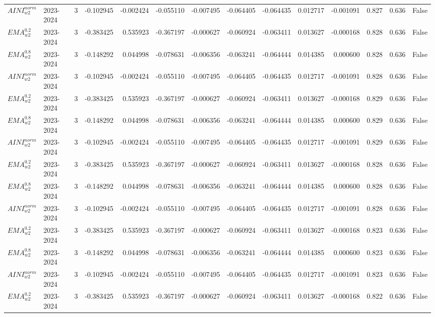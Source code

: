 \begin{tabular}{@{}llrrrrrrrrrlll@{}}
$AINI^{norm}_{w2}$ & 2023-2024 & 3 & -0.102945 & -0.002424 & -0.055110 & -0.007495 & -0.064405 & -0.064435 & 0.012717 & -0.001091 & 0.827 & 0.636 & False \\
$EMA^{0.2}_{w2}$ & 2023-2024 & 3 & -0.383425 & 0.535923 & -0.367197 & -0.000627 & -0.060924 & -0.063411 & 0.013627 & -0.000168 & 0.828 & 0.636 & False \\
$EMA^{0.8}_{w2}$ & 2023-2024 & 3 & -0.148292 & 0.044998 & -0.078631 & -0.006356 & -0.063241 & -0.064444 & 0.014385 & 0.000600 & 0.828 & 0.636 & False \\
$AINI^{norm}_{w2}$ & 2023-2024 & 3 & -0.102945 & -0.002424 & -0.055110 & -0.007495 & -0.064405 & -0.064435 & 0.012717 & -0.001091 & 0.828 & 0.636 & False \\
$EMA^{0.2}_{w2}$ & 2023-2024 & 3 & -0.383425 & 0.535923 & -0.367197 & -0.000627 & -0.060924 & -0.063411 & 0.013627 & -0.000168 & 0.829 & 0.636 & False \\
$EMA^{0.8}_{w2}$ & 2023-2024 & 3 & -0.148292 & 0.044998 & -0.078631 & -0.006356 & -0.063241 & -0.064444 & 0.014385 & 0.000600 & 0.829 & 0.636 & False \\
$AINI^{norm}_{w2}$ & 2023-2024 & 3 & -0.102945 & -0.002424 & -0.055110 & -0.007495 & -0.064405 & -0.064435 & 0.012717 & -0.001091 & 0.829 & 0.636 & False \\
$EMA^{0.2}_{w2}$ & 2023-2024 & 3 & -0.383425 & 0.535923 & -0.367197 & -0.000627 & -0.060924 & -0.063411 & 0.013627 & -0.000168 & 0.828 & 0.636 & False \\
$EMA^{0.8}_{w2}$ & 2023-2024 & 3 & -0.148292 & 0.044998 & -0.078631 & -0.006356 & -0.063241 & -0.064444 & 0.014385 & 0.000600 & 0.828 & 0.636 & False \\
$AINI^{norm}_{w2}$ & 2023-2024 & 3 & -0.102945 & -0.002424 & -0.055110 & -0.007495 & -0.064405 & -0.064435 & 0.012717 & -0.001091 & 0.828 & 0.636 & False \\
$EMA^{0.2}_{w2}$ & 2023-2024 & 3 & -0.383425 & 0.535923 & -0.367197 & -0.000627 & -0.060924 & -0.063411 & 0.013627 & -0.000168 & 0.823 & 0.636 & False \\
$EMA^{0.8}_{w2}$ & 2023-2024 & 3 & -0.148292 & 0.044998 & -0.078631 & -0.006356 & -0.063241 & -0.064444 & 0.014385 & 0.000600 & 0.823 & 0.636 & False \\
$AINI^{norm}_{w2}$ & 2023-2024 & 3 & -0.102945 & -0.002424 & -0.055110 & -0.007495 & -0.064405 & -0.064435 & 0.012717 & -0.001091 & 0.823 & 0.636 & False \\
$EMA^{0.2}_{w2}$ & 2023-2024 & 3 & -0.383425 & 0.535923 & -0.367197 & -0.000627 & -0.060924 & -0.063411 & 0.013627 & -0.000168 & 0.822 & 0.636 & False \\

\end{tabular}
